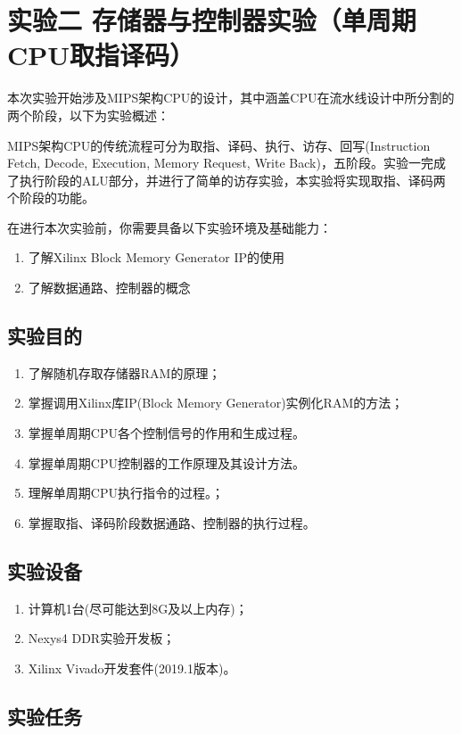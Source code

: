 \section{实验二 \quad 存储器与控制器实验（单周期CPU取指译码）}

本次实验开始涉及MIPS架构CPU的设计，其中涵盖CPU在流水线设计中所分割的两个阶段，以下为实验概述：

MIPS架构CPU的传统流程可分为取指、译码、执行、访存、回写(Instruction Fetch, Decode, Execution, Memory Request, Write Back)，五阶段。实验一完成了执行阶段的ALU部分，并进行了简单的访存实验，本实验将实现取指、译码两个阶段的功能。

在进行本次实验前，你需要具备以下实验环境及基础能力：
\begin{enumerate}
    \item 了解Xilinx Block Memory Generator IP的使用
    \item 了解数据通路、控制器的概念
\end{enumerate}

\subsection{实验目的}

\begin{enumerate}
    \item 了解随机存取存储器RAM的原理；
    \item 掌握调用Xilinx库IP(Block Memory Generator)实例化RAM的方法；
    \item 掌握单周期CPU各个控制信号的作用和生成过程。
    \item 掌握单周期CPU控制器的工作原理及其设计方法。
    \item 理解单周期CPU执行指令的过程。；
    \item 掌握取指、译码阶段数据通路、控制器的执行过程。
\end{enumerate}
\subsection{实验设备}
\begin{enumerate}
    \item 计算机1台(尽可能达到8G及以上内存)；
    \item Nexys4 DDR实验开发板；
    \item Xilinx Vivado开发套件(2019.1版本)。

\end{enumerate}
\newpage
\subsection{实验任务}
